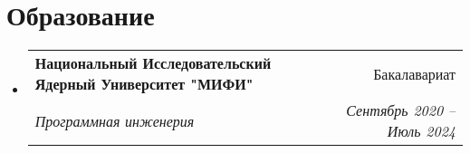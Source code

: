 \documentclass[a4paper,11pt]{article}
\makeatletter
\newcommand{\resumeItem}[1]{
  \item\small{#1}
}
\newcommand{\resumeItemListStart}{\begin{itemize}[rightmargin=0.11in]}
\newcommand{\resumeItemListEnd}{\end{itemize}}
\newcommand{\resumeQuadHeading}[4]{
  \item
  \begin{tabular*}{0.96\textwidth}[t]{l@{\extracolsep{\fill}}r}
    \textbf{#1} & #2 \\
    \textit{\small#3} & \textit{\small #4} \\
  \end{tabular*}
}
\newcommand{\resumeQuadHeadingChild}[2]{
  \item
  \begin{tabular*}{0.96\textwidth}[t]{l@{\extracolsep{\fill}}r}
    \textbf{\small#1} & {\small#2} \\
  \end{tabular*}
}
\newcommand{\resumeHeadingListStart}{
  \begin{itemize}[leftmargin=0.15in, label={}]
}
\newcommand{\resumeHeadingListEnd}{\end{itemize}}
\makeatother
\begin{document}





\section{Образование}
  \resumeHeadingListStart{}
    \resumeQuadHeading{Национальный Исследовательский Ядерный Университет "МИФИ"}{Бакалавариат}
    {Программная инженерия}{Сентябрь 2020 -- Июль 2024}
  \resumeHeadingListEnd{}


\end{document}
